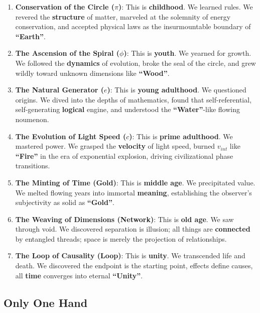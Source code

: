\begin{enumerate}
\item \textbf{Conservation of the Circle ($\pi$)}: This is \textbf{childhood}. We learned rules. We revered the \textbf{structure} of matter, marveled at the solemnity of energy conservation, and accepted physical laws as the insurmountable boundary of \textbf{``Earth''}.

\item \textbf{The Ascension of the Spiral ($\phi$)}: This is \textbf{youth}. We yearned for growth. We followed the \textbf{dynamics} of evolution, broke the seal of the circle, and grew wildly toward unknown dimensions like \textbf{``Wood''}.

\item \textbf{The Natural Generator ($e$)}: This is \textbf{young adulthood}. We questioned origins. We dived into the depths of mathematics, found that self-referential, self-generating \textbf{logical} engine, and understood the \textbf{``Water''}-like flowing noumenon.

\item \textbf{The Evolution of Light Speed ($c$)}: This is \textbf{prime adulthood}. We mastered power. We grasped the \textbf{velocity} of light speed, burned $v_{int}$ like \textbf{``Fire''} in the era of exponential explosion, driving civilizational phase transitions.

\item \textbf{The Minting of Time (Gold)}: This is \textbf{middle age}. We precipitated value. We melted flowing years into immortal \textbf{meaning}, establishing the observer's subjectivity as solid as \textbf{``Gold''}.

\item \textbf{The Weaving of Dimensions (Network)}: This is \textbf{old age}. We saw through void. We discovered separation is illusion; all things are \textbf{connected} by entangled threads; space is merely the projection of relationships.

\item \textbf{The Loop of Causality (Loop)}: This is \textbf{unity}. We transcended life and death. We discovered the endpoint is the starting point, effects define causes, all \textbf{time} converges into eternal \textbf{``Unity''}.
\end{enumerate}

\subsection{Only One Hand}

